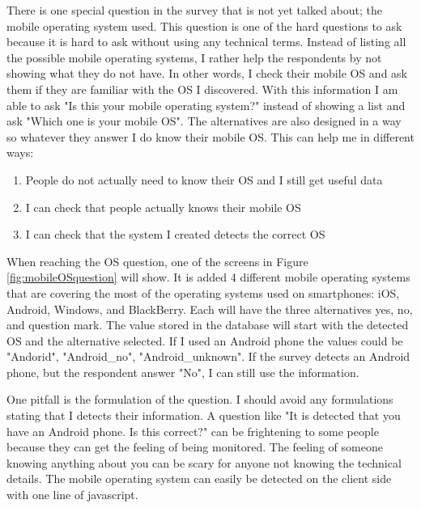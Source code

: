 
    There is one special question in the survey that is not yet talked about; the mobile operating system used. This question is one of the hard questions to ask because it is hard to ask without using any technical terms. Instead of listing all the possible mobile operating systems, I rather help the respondents by not showing what they do not have. In other words, I check their mobile OS and ask them if they are familiar with the OS I discovered. With this information I am able to ask "Is this your mobile operating system?" instead of showing a list and ask "Which one is your mobile OS". The alternatives are also designed in a way so whatever they answer I do know their mobile OS. 
    This can help me in different ways:

      \begin{enumerate}
        \item People do not actually need to know their OS and I still get useful data
        \item I can check that people actually knows their mobile OS
        \item I can check that the system I created detects the correct OS
      \end{enumerate}

    When reaching the OS question, one of the screens in Figure \ref{fig:mobileOSquestion} will show. It is added 4 different mobile operating systems that are covering the most of the operating systems used on smartphones: iOS, Android, Windows, and BlackBerry. 
    Each will have the three alternatives yes, no, and question mark. The value stored in the database will start with the detected OS and the alternative selected. If I used an Android phone the values could be "Andorid", "Android\_no", "Android\_unknown". If the survey detects an Android phone, but the respondent answer "No", I can still use the information.

    One pitfall is the formulation of the question. I should avoid any formulations stating that I detects their information. A question like "It is detected that you have an Android phone. Is this correct?" can be frightening to some people because they can get the feeling of being monitored. The feeling of someone knowing anything about you can be scary for anyone not knowing the technical details. The mobile operating system can easily be detected on the client side with one line of javascript. 

